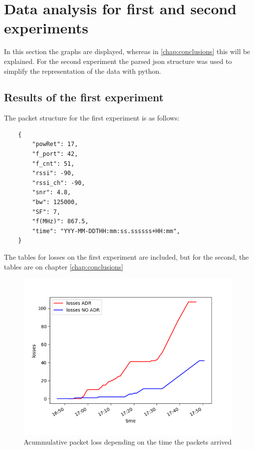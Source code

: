 \chapter{Data analysis for first and second experiments}
\label{chap:fifth}
\ifpdf
    \graphicspath{{Chapter5/Figures/PNG/}{Chapter5/Figures/PDF/}{Chapter5/Figures/}}
\else
    \graphicspath{{Chapter5/Figures/EPS/}{Chapter5/Figures/}}
\fi

In this section the graphs are displayed, whereas in \ref{chap:conclusions} this will be 
explained. For the second experiment the parsed json structure was used to simplify the 
representation of the data with python.
\section{Results of the first experiment}
The packet structure for the first experiment is as follows:

\begin{verbatim}
    {
        "powRet": 17,
        "f_port": 42,
        "f_cnt": 51,
        "rssi": -90,
        "rssi_ch": -90,
        "snr": 4.8,
        "bw": 125000,
        "SF": 7,
        "f(MHz)": 867.5,
        "time": "YYY-MM-DDTHH:mm:ss.ssssss+HH:mm",
    }
\end{verbatim}


The tables for losses on the first experiment are included, but for the second, the tables are on 
 chapter \ref{chap:conclusions} \\
\begin{figure}[htbp]

    \includegraphics[width=\linewidth]{losses.png}
    \caption{Acummulative packet loss depending on the time the packets arrived}
    \label{chap:fifth:fig:1}
\end{figure}

